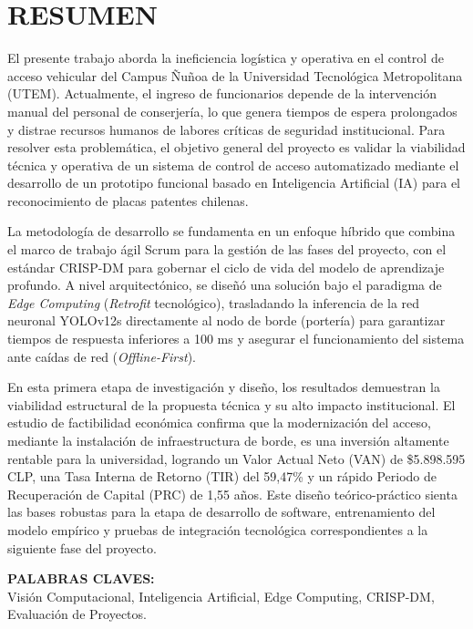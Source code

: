 
\chapter*{RESUMEN}
\thispagestyle{fancy}

El presente trabajo aborda la ineficiencia logística y operativa en el control de acceso vehicular del Campus Ñuñoa de la Universidad Tecnológica Metropolitana (UTEM). Actualmente, el ingreso de funcionarios depende de la intervención manual del personal de conserjería, lo que genera tiempos de espera prolongados y distrae recursos humanos de labores críticas de seguridad institucional. Para resolver esta problemática, el objetivo general del proyecto es validar la viabilidad técnica y operativa de un sistema de control de acceso automatizado mediante el desarrollo de un prototipo funcional basado en Inteligencia Artificial (IA) para el reconocimiento de placas patentes chilenas.

La metodología de desarrollo se fundamenta en un enfoque híbrido que combina el marco de trabajo ágil Scrum para la gestión de las fases del proyecto, con el estándar CRISP-DM para gobernar el ciclo de vida del modelo de aprendizaje profundo. A nivel arquitectónico, se diseñó una solución bajo el paradigma de \textit{Edge Computing} (\textit{Retrofit} tecnológico), trasladando la inferencia de la red neuronal YOLOv12s directamente al nodo de borde (portería) para garantizar tiempos de respuesta inferiores a 100 ms y asegurar el funcionamiento del sistema ante caídas de red (\textit{Offline-First}).

En esta primera etapa de investigación y diseño, los resultados demuestran la viabilidad estructural de la propuesta técnica y su alto impacto institucional. El estudio de factibilidad económica confirma que la modernización del acceso, mediante la instalación de infraestructura de borde, es una inversión altamente rentable para la universidad, logrando un Valor Actual Neto (VAN) de \$5.898.595 CLP, una Tasa Interna de Retorno (TIR) del 59,47\% y un rápido Periodo de Recuperación de Capital (PRC) de 1,55 años. Este diseño teórico-práctico sienta las bases robustas para la etapa de desarrollo de software, entrenamiento del modelo empírico y pruebas de integración tecnológica correspondientes a la siguiente fase del proyecto.

\noindent\textbf{PALABRAS CLAVES:}\\
Visión Computacional, Inteligencia Artificial, Edge Computing, CRISP-DM, Evaluación de Proyectos.

\newpage
